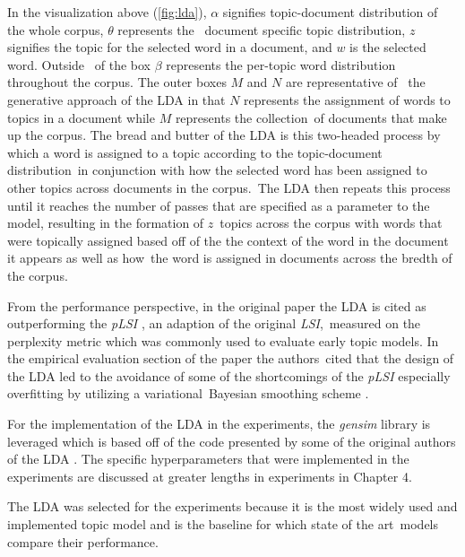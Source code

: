 \documentclass[letterpaper,12pt]{article}
\begin{document}

In the visualization above (\ref{fig:lda}), $\alpha$ signifies topic-document distribution of the whole corpus, $\theta$ represents the \
document specific topic distribution, $z$ signifies the topic for the selected word in a document, and $w$ is the selected word. Outside \
of the box $\beta$ represents the per-topic word distribution throughout the corpus. The outer boxes $M$ and $N$ are representative of \
the generative approach of the LDA in that $N$ represents the assignment of words to topics in a document while $M$ represents the collection\
of documents that make up the corpus.
The bread and butter of the LDA is this two-headed process by which a word is assigned to a topic according to the topic-document distribution\
in conjunction with how the selected word has been assigned to other topics across documents in the corpus.\
The LDA then repeats this process until it reaches the number of passes that are specified as a parameter to the model, resulting in the formation of $z$\
topics across the corpus with words that were topically assigned based off of the the context of the word in the document it appears as well as how\
the word is assigned in documents across the bredth of the corpus.

From the performance perspective, in the original paper the LDA is cited as outperforming the \emph{pLSI} \cite{hofmann1999probabilistic}, an adaption of the original \emph{LSI},\
measured on the perplexity metric which was commonly used to evaluate early topic models. In the empirical evaluation section of the paper the authors\
cited that the design of the LDA led to the avoidance of some of the shortcomings of the \emph{pLSI} especially overfitting by utilizing a variational\
Bayesian smoothing scheme \cite{attias2000variational} \cite{blei2003latent}. 

For the implementation of the LDA in the experiments, the \emph{gensim} library is leveraged which is based off of the code presented by some of the original authors of the LDA \cite{hoffman2010online}.
The specific hyperparameters that were implemented in the experiments are discussed at greater lengths in experiments in Chapter 4.

The LDA was selected for the experiments because it is the most widely used and implemented topic model and is the baseline for which state of the art\
models compare their performance.
\end{document}
